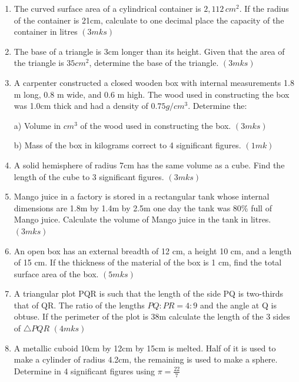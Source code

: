 \documentclass[
  letterpaper,
  DIV=11,
  numbers=noendperiod]{scrreprt}
\begin{document}
\begin{tcolorbox}
\begin{enumerate}
\def\labelenumi{\arabic{enumi}.}
\setcounter{enumi}{4}
\item
  The curved surface area of a cylindrical container is \(2,112\,cm^2\).
  If the radius of the container is 21cm, calculate to one decimal place
  the capacity of the container in litres \hspace{2.1 cm} \((3mks)\)
\item
  The base of a triangle is 3cm longer than its height. Given that the
  area of the triangle is \(35cm^2\), determine the base of the
  triangle. \hspace{7.2 cm} \((3mks)\)
\item
  A carpenter constructed a closed wooden box with internal measurements
  1.8 m long, 0.8 m wide, and 0.6 m high. The wood used in constructing
  the box was 1.0cm thick and had a density of \(0.75g/cm^{3}\).
  Determine the:

  a) Volume in \(cm^3\) of the wood used in constructing the box.
  \hspace{4.2 cm} \((3mks)\)

  b) Mass of the box in kilograms correct to 4 significant figures.
  \hspace{3.6 cm} \((1mk)\)
\item
  A solid hemisphere of radius 7cm has the same volume as a cube. Find
  the length of the cube to 3 significant figures. \hspace{10.4 cm}
  \((3mks)\)
\item
  Mango juice in a factory is stored in a rectangular tank whose
  internal dimensions are 1.8m by 1.4m by 2.5m one day the tank was 80\%
  full of Mango juice. Calculate the volume of Mango juice in the tank
  in litres. \hspace{10 cm} \((3mks)\)
\item
  An open box has an external breadth of 12 cm, a height 10 cm, and a
  length of 15 cm. If the thickness of the material of the box is 1 cm,
  find the total surface area of the box. \hspace{3.7cm} \((5mks)\)
\item
  A triangular plot PQR is such that the length of the side PQ is
  two-thirds that of QR. The ratio of the lengths \(PQ: PR = 4:9\) and
  the angle at Q is obtuse. If the perimeter of the plot is 38m
  calculate the length of the 3 sides of \(\triangle PQR\)
  \hspace{7.5cm} \((4mks)\)
\item
  A metallic cuboid 10cm by 12cm by 15cm is melted. Half of it is used
  to make a cylinder of radius 4.2cm, the remaining is used to make a
  sphere. Determine in 4 significant figures using \(\pi= \frac{22}{7}\)


\end{enumerate}
\end{tcolorbox}
\end{document}
